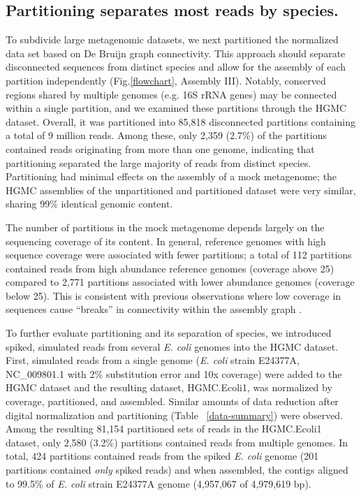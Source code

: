 \documentclass{pnastwo}
\begin{document}
\begin{article}
\subsection*{Partitioning separates most reads by species.}  To subdivide large metagenomic datasets, we next partitioned
the normalized data set based on De Bruijn graph connectivity.  This approach should separate disconnected sequences from distinct species and allow for the assembly of each partition independently (Fig.\ref{flowchart}, Assembly III).  Notably, conserved regions shared by multiple genomes (e.g. 16S rRNA genes) may be connected within a single partition, and we examined these partitions through the HGMC dataset.  Overall, it was partitioned into 85,818 disconnected partitions containing a total of 9
million reads. Among these, only 2,359 (2.7\%) of the partitions contained reads
originating from more than one genome, indicating that partitioning separated
the large majority of reads from distinct species.  Partitioning had minimal effects on the assembly of a mock metagenome; the HGMC assemblies of the unpartitioned and
partitioned dataset were very similar, sharing 99\% identical genomic content.

The number of partitions in the mock metagenome depends largely on the sequencing coverage of its content. In general, reference genomes with high sequence coverage were associated with
fewer partitions; a total of 112 partitions contained reads from
high abundance reference genomes (coverage above 25) compared to 2,771
partitions associated with lower abundance genomes (coverage below 25). This is
consistent with previous observations where low coverage in sequences cause
``breaks'' in connectivity within the assembly graph
\cite{Chaisson:2008p1373,Pevzner:2001p1374}.

To further evaluate partitioning and its separation of species, we introduced spiked, simulated
reads from several \emph{E. coli} genomes into the HGMC dataset. First, simulated reads
from a single genome (\emph{E. coli} strain E24377A, NC\_009801.1 with 2\%
substitution error and 10x coverage) were added to the HGMC dataset and the
resulting dataset, HGMC.Ecoli1, was normalized by coverage, partitioned, and
assembled. Similar amounts of data reduction after digital normalization and
partitioning (Table ~\ref{data-summary}) were observed. Among the resulting 81,154
partitioned sets of reads in the HGMC.Ecoli1 dataset, only 2,580 (3.2\%)
partitions contained reads from multiple genomes. In total, 424 partitions
contained reads from the spiked \emph{E. coli} genome (201 partitions contained
\emph{only} spiked reads) and when assembled, the contigs aligned to 99.5\% of
\emph{E. coli} strain E24377A genome (4,957,067 of 4,979,619 bp).


\end{article}
\end{document}
